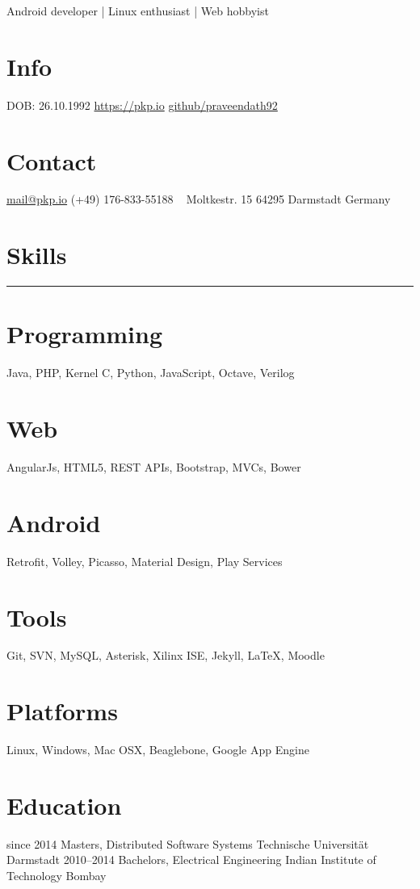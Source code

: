 \documentclass[]{friggeri-cv}
\begin{document}
       {Android developer | Linux enthusiast | Web hobbyist}

\begin{aside}
  \section{Info}
    DOB: 26.10.1992
    \href{https://pkp.io}{https://pkp.io}
    \href{https://github.com/praveendath92}{github/praveendath92}
  \section{Contact}
    \href{mailto:mail@pkp.io}{mail@pkp.io}
    (+49) 176-833-55188
    ~
    Moltkestr. 15
    64295 Darmstadt
    Germany
    ~
  \section{Skills}
    \noindent\rule{3cm}{0.5pt}
  \section{Programming}
    Java, PHP, Kernel C, Python, JavaScript, Octave, Verilog
  \section{Web}
    AngularJs, HTML5, REST APIs, Bootstrap, MVCs, Bower
  \section{Android}
    Retrofit, Volley, Picasso, Material Design, Play Services
  \section{Tools}
    Git, SVN, MySQL, Asterisk, Xilinx ISE, Jekyll, \LaTeX, Moodle
  \section{Platforms}
    Linux, Windows, Mac OSX, Beaglebone, Google App Engine
\end{aside}


\section{Education}

\begin{entrylist}
  \entry
    {since 2014}
    {Masters, {\normalfont Distributed Software Systems}}
    {Technische Universität Darmstadt}
    {}%
  \entry
    {2010–2014}
    {Bachelors, {\normalfont Electrical Engineering}}
    {Indian Institute of Technology Bombay}
    {}%
\end{entrylist}
\end{document}

